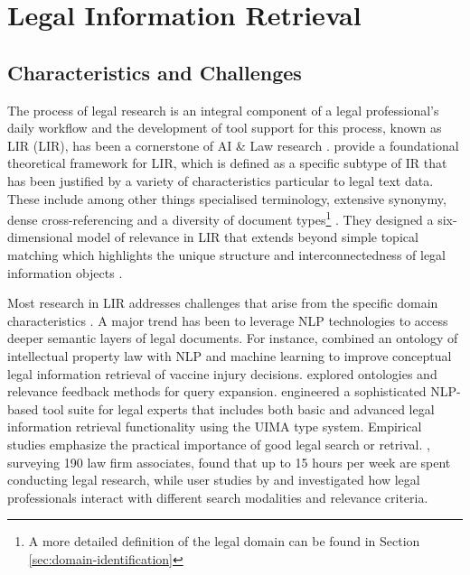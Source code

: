 \section{Legal Information Retrieval}

\subsection{Characteristics and Challenges}

The process of legal research is an integral component of a legal professional's daily workflow and the development of tool support for this process, known as \acl{LIR} (\acs{LIR}), has been a cornerstone of \ac{AI} \& Law research \cite{van_opijnen_concept_2017}\citep[p. 21]{landthaler_improving_2019}. \citet{van_opijnen_concept_2017} provide a foundational theoretical framework for \ac{LIR}, which is defined as a specific subtype of \ac{IR} that has been justified by a variety of characteristics particular to legal text data. These include among other things specialised terminology, extensive synonymy, dense cross-referencing and a diversity of document types\footnote{A more detailed definition of the legal domain can be found in Section \ref{sec:domain-identification}} \cite{van_opijnen_concept_2017}. They designed a six-dimensional model of relevance in \ac{LIR} that extends beyond simple topical matching which highlights the unique structure and interconnectedness of legal information objects \cite{van_opijnen_concept_2017}.

Most research in \ac{LIR} addresses challenges that arise from the specific domain characteristics \cite{hafner_1978, bing_designing_1987, Dick1991_Representation, Ashley_2017}. A major trend has been to leverage \ac{NLP} technologies to access deeper semantic layers of legal documents. For instance, \citet{Grabmair_2015} combined an ontology of intellectual property law with \ac{NLP} and machine learning to improve conceptual legal information retrieval of vaccine injury decisions. \citet{schweighofer2007legal} explored ontologies and relevance feedback methods for query expansion. \citet{waltl2018semantic} engineered a sophisticated \ac{NLP}-based tool suite for legal experts that includes both basic and advanced legal information retrieval functionality using the UIMA type system. Empirical studies emphasize the practical importance of good legal search or retrival. \citet{lastres2015rebooting}, surveying 190 law firm associates, found that up to 15 hours per week are spent conducting legal research, while user studies by \citet{peoples2005death} and \citet{wiggers2018exploration} investigated how legal professionals interact with different search modalities and relevance criteria. 

